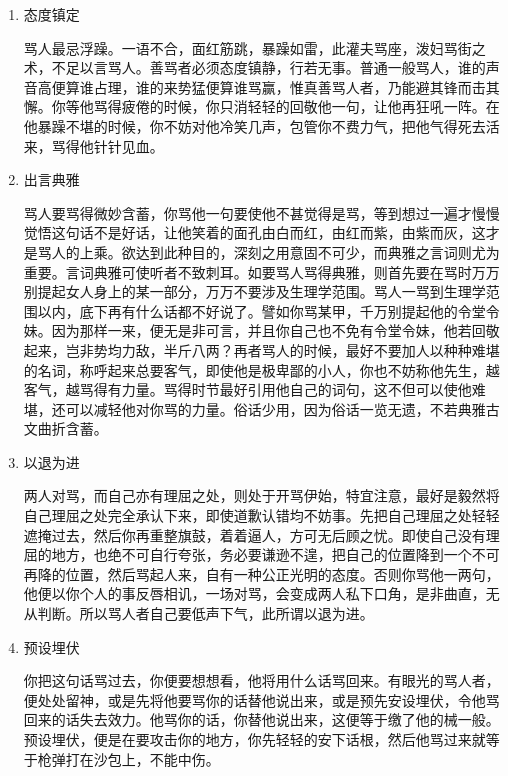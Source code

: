 \begin{enumerate}
\item 态度镇定

\hspace{1.8em}骂人最忌浮躁。一语不合，面红筋跳，暴躁如雷，此灌夫骂座，泼妇骂街之术，不足以言骂人。善骂者必须态度镇静，行若无事。普通一般骂人，谁的声音高便算谁占理，谁的来势猛便算谁骂赢，惟真善骂人者，乃能避其锋而击其懈。你等他骂得疲倦的时候，你只消轻轻的回敬他一句，让他再狂吼一阵。在他暴躁不堪的时候，你不妨对他冷笑几声，包管你不费力气，把他气得死去活来，骂得他针针见血。

\item 出言典雅

\hspace{1.8em}骂人要骂得微妙含蓄，你骂他一句要使他不甚觉得是骂，等到想过一遍才慢慢觉悟这句话不是好话，让他笑着的面孔由白而红，由红而紫，由紫而灰，这才是骂人的上乘。欲达到此种目的，深刻之用意固不可少，而典雅之言词则尤为重要。言词典雅可使听者不致刺耳。如要骂人骂得典雅，则首先要在骂时万万别提起女人身上的某一部分，万万不要涉及生理学范围。骂人一骂到生理学范围以内，底下再有什么话都不好说了。譬如你骂某甲，千万别提起他的令堂令妹。因为那样一来，便无是非可言，并且你自己也不免有令堂令妹，他若回敬起来，岂非势均力敌，半斤八两？再者骂人的时候，最好不要加人以种种难堪的名词，称呼起来总要客气，即使他是极卑鄙的小人，你也不妨称他先生，越客气，越骂得有力量。骂得时节最好引用他自己的词句，这不但可以使他难堪，还可以减轻他对你骂的力量。俗话少用，因为俗话一览无遗，不若典雅古文曲折含蓄。

\item 以退为进

\hspace{1.8em}两人对骂，而自己亦有理屈之处，则处于开骂伊始，特宜注意，最好是毅然将自己理屈之处完全承认下来，即使道歉认错均不妨事。先把自己理屈之处轻轻遮掩过去，然后你再重整旗鼓，着着逼人，方可无后顾之忧。即使自己没有理屈的地方，也绝不可自行夸张，务必要谦逊不遑，把自己的位置降到一个不可再降的位置，然后骂起人来，自有一种公正光明的态度。否则你骂他一两句，他便以你个人的事反唇相讥，一场对骂，会变成两人私下口角，是非曲直，无从判断。所以骂人者自己要低声下气，此所谓以退为进。

\item 预设埋伏

\hspace{1.8em}你把这句话骂过去，你便要想想看，他将用什么话骂回来。有眼光的骂人者，便处处留神，或是先将他要骂你的话替他说出来，或是预先安设埋伏，令他骂回来的话失去效力。他骂你的话，你替他说出来，这便等于缴了他的械一般。预设埋伏，便是在要攻击你的地方，你先轻轻的安下话根，然后他骂过来就等于枪弹打在沙包上，不能中伤。


\end{enumerate}
